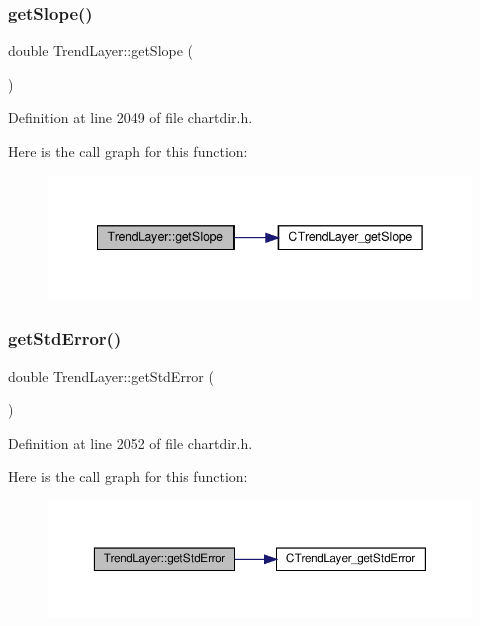 \subsubsection{\texorpdfstring{get\+Slope()}{getSlope()}}
{\footnotesize\ttfamily double Trend\+Layer\+::get\+Slope (\begin{DoxyParamCaption}{ }\end{DoxyParamCaption})\hspace{0.3cm}{\ttfamily [inline]}}



Definition at line 2049 of file chartdir.\+h.

Here is the call graph for this function\+:
\nopagebreak
\begin{figure}[H]
\begin{center}
\leavevmode
\includegraphics[width=342pt]{class_trend_layer_a58989a5b0fc6ed23b5bb7433f792bc6c_cgraph}
\end{center}
\end{figure}
\mbox{\label{class_trend_layer_a73c024bd734f3c65bfe706afab186bfe}} 
\subsubsection{\texorpdfstring{get\+Std\+Error()}{getStdError()}}
{\footnotesize\ttfamily double Trend\+Layer\+::get\+Std\+Error (\begin{DoxyParamCaption}{ }\end{DoxyParamCaption})\hspace{0.3cm}{\ttfamily [inline]}}



Definition at line 2052 of file chartdir.\+h.

Here is the call graph for this function\+:
\nopagebreak
\begin{figure}[H]
\begin{center}
\leavevmode
\includegraphics[width=350pt]{class_trend_layer_a73c024bd734f3c65bfe706afab186bfe_cgraph}
\end{center}
\end{figure}
\mbox{\label{class_trend_layer_af0bec09b9dd8ed3fea44cd133addd76a}} 
